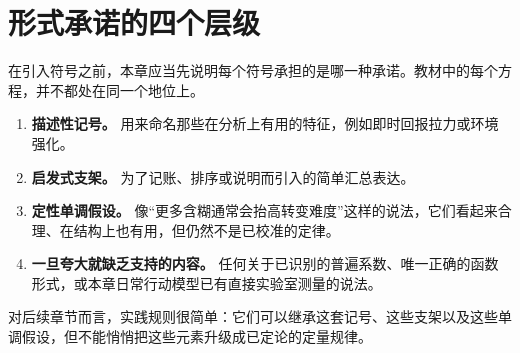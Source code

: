 \section{形式承诺的四个层级}

在引入符号之前，本章应当先说明每个符号承担的是哪一种承诺。教材中的每个方程，并不都处在同一个地位上。

\begin{enumerate}[nosep]
  \item \textbf{描述性记号。} 用来命名那些在分析上有用的特征，例如即时回报拉力或环境强化。
  \item \textbf{启发式支架。} 为了记账、排序或说明而引入的简单汇总表达。
  \item \textbf{定性单调假设。} 像“更多含糊通常会抬高转变难度”这样的说法，它们看起来合理、在结构上也有用，但仍然不是已校准的定律。
  \item \textbf{一旦夸大就缺乏支持的内容。} 任何关于已识别的普遍系数、唯一正确的函数形式，或本章日常行动模型已有直接实验室测量的说法。
\end{enumerate}

\begin{remark}
对后续章节而言，实践规则很简单：它们可以继承这套记号、这些支架以及这些单调假设，但不能悄悄把这些元素升级成已定论的定量规律。
\end{remark}